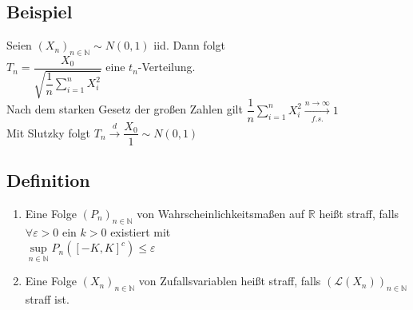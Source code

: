 \documentclass[german,10pt,oneside, fleqn, a4paper]{article}
\newcommand {\R}	{\mathbb{R}}
\newcommand {\N}	{\mathbb{N}}
\newcommand{\sm}[2][\infty]{\sum\limits_{#2}^{#1}}
\newcommand{\folge}[3][\N]{\left(#2_#3\right)_{#3\in #1}}
\newcommand{\mc}[1]{\mathcal{#1}}
\newcommand{\toinf}{\rightarrow\infty}
\newcommand{\1}[1]{1_{#1}}
\newcommand{\2}[1]{\1{\brac{#1}}}
\newcommand{\xr}[2][]{\xrightarrow[#1]{#2}}
\begin{document}
\subsection{Beispiel}
\label{3.13}
Seien $\folge{X}{n}\sim N(0,1)$ iid. Dann folgt\\
$T_n=\dfrac{X_0}{\sqrt{\dfrac{1}{n}\sm[n]{i=1}X_i^2}}$ eine $t_n$-Verteilung.\\
Nach dem starken Gesetz der großen Zahlen gilt $\dfrac{1}{n}\sm[n]{i=1}X_i^2\xr[f.s.]{n\toinf}1$\\
Mit Slutzky folgt $T_n\xr{d}\dfrac{X_0}{1}\sim N(0,1)$

\subsection{Definition}
\label{3.14}
\begin{enumerate}[label=(\alph*)]
\item Eine Folge $\folge{P}{n}$ von Wahrscheinlichkeitsmaßen auf $\R$ heißt straff, falls $\forall\varepsilon>0$ ein $k>0$ existiert mit\\
$\sup\limits_{n\in\N}P_n([-K,K]^c)\leq\varepsilon$
\item Eine Folge $\folge{X}{n}$ von Zufallsvariablen heißt straff, falls $(\mc{L}(X_n))_{n\in\N}$ straff ist.
\end{enumerate}
\end{document}
